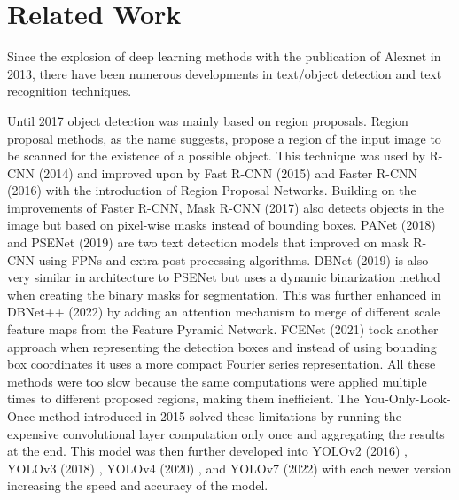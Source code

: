 \chapter{Related Work}
\label{ch:rw}

Since the explosion of deep learning methods with the publication of Alexnet in 2013, there have been numerous developments in text/object detection and text recognition techniques.

Until 2017 object detection was mainly based on region proposals. Region proposal methods, as the name suggests, propose a region of the input image to be scanned for the existence of a possible object. This technique was used by R-CNN \cite{girshick_rich_2014} (2014) and improved upon by Fast R-CNN \cite{girshick_fast_2015} (2015) and Faster R-CNN \cite{ren_faster_2017} (2016) with the introduction of Region Proposal Networks. Building on the improvements of Faster R-CNN, Mask R-CNN \cite{he_mask_2017} (2017) also detects objects in the image but based on pixel-wise masks instead of bounding boxes. PANet \cite{liu_path_2018} (2018) and PSENet \cite{wang_shape_2019} (2019) are two text detection models that improved on mask R-CNN using FPNs and extra post-processing algorithms. DBNet \cite{liao_real-time_2019} (2019) is also very similar in architecture to PSENet but uses a dynamic binarization method when creating the binary masks for segmentation. This was further enhanced in DBNet++ \cite{liao_real-time_2023} (2022) by adding an attention mechanism to merge of different scale feature maps from the Feature Pyramid Network. FCENet \cite{riaz_fouriernet_2021} (2021) took another approach when representing the detection boxes and instead of using bounding box coordinates it uses a more compact Fourier series representation. All these methods were too slow because the same computations were applied multiple times to different proposed regions, making them inefficient. The You-Only-Look-Once method introduced in 2015 \cite{redmon_you_2016} solved these limitations by running the expensive convolutional layer computation only once and aggregating the results at the end. This model was then further developed into YOLOv2 (2016) \cite{redmon_yolo9000_2017}, YOLOv3 (2018) \cite{redmon_yolov3_2018}, YOLOv4 (2020) \cite{wang_scaled-yolov4_2021}, and YOLOv7 (2022) \cite{wang_yolov7_2022} with each newer version increasing the speed and accuracy of the model.

